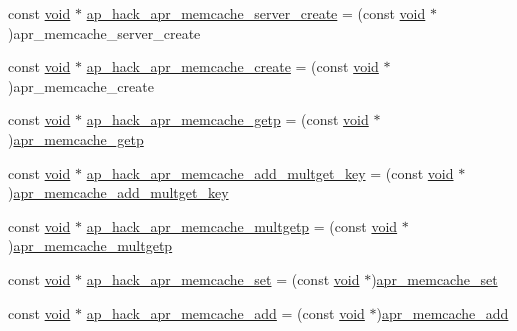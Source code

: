 \begin{DoxyCompactItemize}
\item 
const \hyperlink{group__MOD__ISAPI_gacd6cdbf73df3d9eed42fa493d9b621a6}{void} $\ast$ \hyperlink{srclib_2apr-util_2exports_8c_a1b08f76a730188f8392fba7854784c1c}{ap\+\_\+hack\+\_\+apr\+\_\+memcache\+\_\+server\+\_\+create} = (const \hyperlink{group__MOD__ISAPI_gacd6cdbf73df3d9eed42fa493d9b621a6}{void} $\ast$)apr\+\_\+memcache\+\_\+server\+\_\+create
\item 
const \hyperlink{group__MOD__ISAPI_gacd6cdbf73df3d9eed42fa493d9b621a6}{void} $\ast$ \hyperlink{srclib_2apr-util_2exports_8c_a6835787c5630b216cb0346e3c5f8c5ed}{ap\+\_\+hack\+\_\+apr\+\_\+memcache\+\_\+create} = (const \hyperlink{group__MOD__ISAPI_gacd6cdbf73df3d9eed42fa493d9b621a6}{void} $\ast$)apr\+\_\+memcache\+\_\+create
\item 
const \hyperlink{group__MOD__ISAPI_gacd6cdbf73df3d9eed42fa493d9b621a6}{void} $\ast$ \hyperlink{srclib_2apr-util_2exports_8c_ae5710c6d9b3b9e3663155643076045be}{ap\+\_\+hack\+\_\+apr\+\_\+memcache\+\_\+getp} = (const \hyperlink{group__MOD__ISAPI_gacd6cdbf73df3d9eed42fa493d9b621a6}{void} $\ast$)\hyperlink{apr__memcache_8c_ae11dedf5806202d94ee26c16b88c3a97}{apr\+\_\+memcache\+\_\+getp}
\item 
const \hyperlink{group__MOD__ISAPI_gacd6cdbf73df3d9eed42fa493d9b621a6}{void} $\ast$ \hyperlink{srclib_2apr-util_2exports_8c_a26c5bb0314a60ac2ea9d41feb2346c49}{ap\+\_\+hack\+\_\+apr\+\_\+memcache\+\_\+add\+\_\+multget\+\_\+key} = (const \hyperlink{group__MOD__ISAPI_gacd6cdbf73df3d9eed42fa493d9b621a6}{void} $\ast$)\hyperlink{apr__memcache_8c_a71aeaf99e4a0f0b8d70dec5faa78b2ac}{apr\+\_\+memcache\+\_\+add\+\_\+multget\+\_\+key}
\item 
const \hyperlink{group__MOD__ISAPI_gacd6cdbf73df3d9eed42fa493d9b621a6}{void} $\ast$ \hyperlink{srclib_2apr-util_2exports_8c_a70bda0fc06989b43088d6234d10c5476}{ap\+\_\+hack\+\_\+apr\+\_\+memcache\+\_\+multgetp} = (const \hyperlink{group__MOD__ISAPI_gacd6cdbf73df3d9eed42fa493d9b621a6}{void} $\ast$)\hyperlink{apr__memcache_8c_a2179ed02f760f2366820cb0f184bf97f}{apr\+\_\+memcache\+\_\+multgetp}
\item 
const \hyperlink{group__MOD__ISAPI_gacd6cdbf73df3d9eed42fa493d9b621a6}{void} $\ast$ \hyperlink{srclib_2apr-util_2exports_8c_af8808b69cfb4719ddf16768be9c8c0ea}{ap\+\_\+hack\+\_\+apr\+\_\+memcache\+\_\+set} = (const \hyperlink{group__MOD__ISAPI_gacd6cdbf73df3d9eed42fa493d9b621a6}{void} $\ast$)\hyperlink{apr__memcache_8c_a89189fbf4bee086f3350978907abe7ac}{apr\+\_\+memcache\+\_\+set}
\item 
const \hyperlink{group__MOD__ISAPI_gacd6cdbf73df3d9eed42fa493d9b621a6}{void} $\ast$ \hyperlink{srclib_2apr-util_2exports_8c_af575d3b0916a2174848dddc6d872acfe}{ap\+\_\+hack\+\_\+apr\+\_\+memcache\+\_\+add} = (const \hyperlink{group__MOD__ISAPI_gacd6cdbf73df3d9eed42fa493d9b621a6}{void} $\ast$)\hyperlink{apr__memcache_8c_a63c21dbe2830e6de0f720a2751c94752}{apr\+\_\+memcache\+\_\+add}

\end{DoxyCompactItemize}
